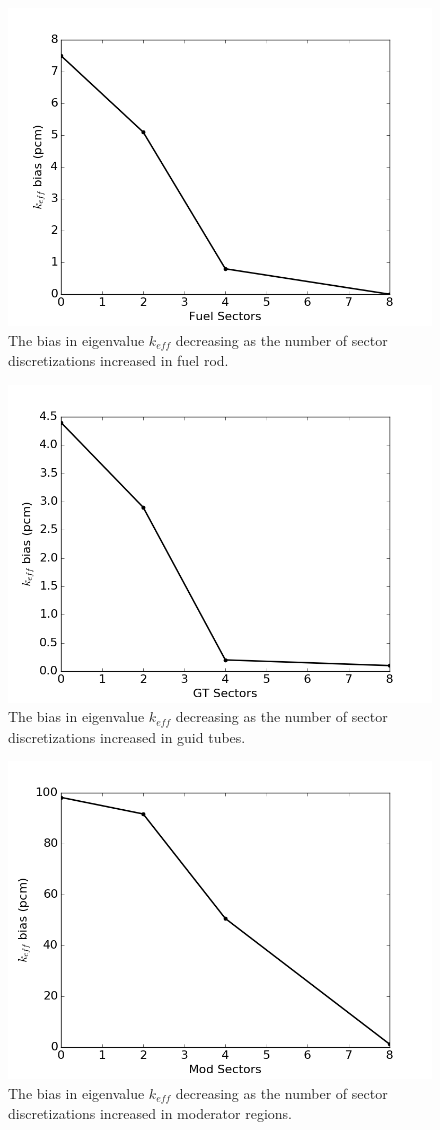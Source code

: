 \begin{figure}[h!]
	\centering
	\includegraphics[width=0.7\linewidth]{figures/results/sensitivity/fuel_sectors.png}
	\caption[]{The bias in eigenvalue $k_{\textit{eff}}$ decreasing as the number of sector discretizations increased in fuel rod.}
	\label{fig:fuel-sectors}
\end{figure}
\begin{figure}[h!]
	\centering
	\includegraphics[width=0.7\linewidth]{figures/results/sensitivity/gt_sectors.png}
	\caption[]{The bias in eigenvalue $k_{\textit{eff}}$ decreasing as the number of sector discretizations increased in guid tubes.}
	\label{fig:gt-sectors}
\end{figure}
\begin{figure}[h!]
	\centering
	\includegraphics[width=0.7\linewidth]{figures/results/sensitivity/mod_sectors.png}
	\caption[]{The bias in eigenvalue $k_{\textit{eff}}$ decreasing as the number of sector discretizations increased in moderator regions.}
	\label{fig:mod-sectors}
\end{figure}

